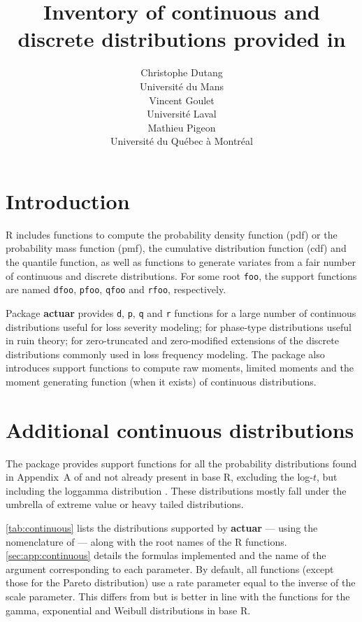 \documentclass[x11names]{article}
\title{Inventory of continuous and discrete distributions provided
    in \pkg{actuar}}
\author{Christophe Dutang \\ Université du Mans \\[3ex]
    Vincent Goulet \\ Université Laval \\[3ex]
    Mathieu Pigeon \\ Université du Québec à Montréal}
\date{}
\newcommand{\proglang}[1]{\textsf{#1}}
\newcommand{\pkg}[1]{\textbf{#1}}
\newcommand{\code}[1]{\texttt{#1}}
\begin{document}
\maketitle

\section{Introduction}
\label{sec:introduction}

\proglang{R} includes functions to compute the probability density
function (pdf) or the probability mass function (pmf), the cumulative
distribution function (cdf) and the quantile function, as well as
functions to generate variates from a fair number of continuous and
discrete distributions. For some root \code{foo}, the support
functions are named \code{dfoo}, \code{pfoo}, \code{qfoo} and
\code{rfoo}, respectively.

Package \pkg{actuar} provides \code{d}, \code{p}, \code{q} and
\code{r} functions for a large number of continuous distributions
useful for loss severity modeling; for phase-type distributions useful
in ruin theory; for zero-truncated and zero-modified extensions of the
discrete distributions commonly used in loss frequency modeling. The
package also introduces support functions to compute raw moments,
limited moments and the moment generating function (when it exists) of
continuous distributions.


\section{Additional continuous distributions}
\label{sec:continuous}

The package provides support functions for all the probability
distributions found in Appendix~A of \cite{LossModels4e} and not
already present in base \proglang{R}, excluding the log-$t$, but
including the loggamma distribution \citep{HoggKlugman}. These
distributions mostly fall under the umbrella of extreme value or
heavy tailed distributions.

\autoref{tab:continuous} lists the distributions supported by
\pkg{actuar} --- using the nomenclature of \cite{LossModels4e} ---
along with the root names of the \proglang{R} functions.
\autoref{sec:app:continuous} details the formulas implemented and the
name of the argument corresponding to each parameter. By default, all
functions (except those for the Pareto distribution) use a rate
parameter equal to the inverse of the scale parameter. This differs
from \cite{LossModels4e} but is better in line with the functions for
the gamma, exponential and Weibull distributions in base \proglang{R}.
\end{document}
